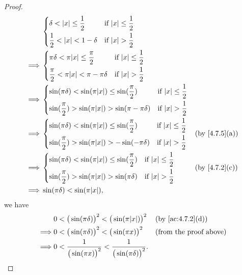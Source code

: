 \begin{proof}
\begin{align*}
             & \begin{dcases}
                 \delta < \abs{x} \leq \dfrac{1}{2}  & \text{if } \abs{x} \leq \dfrac{1}{2} \\
                 \dfrac{1}{2} < \abs{x} < 1 - \delta & \text{if } \abs{x} > \dfrac{1}{2}    \\
               \end{dcases}                               \\
    \implies & \begin{dcases}
                 \pi \delta < \pi \abs{x} \leq \dfrac{\pi}{2}    & \text{if } \abs{x} \leq \dfrac{1}{2} \\
                 \dfrac{\pi}{2} < \pi \abs{x} < \pi - \pi \delta & \text{if } \abs{x} > \dfrac{1}{2}    \\
               \end{dcases}                   \\
    \implies & \begin{dcases}
                 \sin(\pi \delta) < \sin(\pi \abs{x}) \leq \sin(\dfrac{\pi}{2})    & \text{if } \abs{x} \leq \dfrac{1}{2} \\
                 \sin(\dfrac{\pi}{2}) > \sin(\pi \abs{x}) > \sin(\pi - \pi \delta) & \text{if } \abs{x} > \dfrac{1}{2}    \\
               \end{dcases} \\
    \implies & \begin{dcases}
                 \sin(\pi \delta) < \sin(\pi \abs{x}) \leq \sin(\dfrac{\pi}{2}) & \text{if } \abs{x} \leq \dfrac{1}{2} \\
                 \sin(\dfrac{\pi}{2}) > \sin(\pi \abs{x}) > -\sin(-\pi \delta)  & \text{if } \abs{x} > \dfrac{1}{2}    \\
               \end{dcases}    &  & \text{(by \cref{4.7.5}(a))}    \\
    \implies & \begin{dcases}
                 \sin(\pi \delta) < \sin(\pi \abs{x}) \leq \sin(\dfrac{\pi}{2}) & \text{if } \abs{x} \leq \dfrac{1}{2} \\
                 \sin(\dfrac{\pi}{2}) > \sin(\pi \abs{x}) > \sin(\pi \delta)    & \text{if } \abs{x} > \dfrac{1}{2}    \\
               \end{dcases}    &  & \text{(by \cref{4.7.2}(c))}    \\
    \implies & \sin(\pi \delta) < \sin(\pi \abs{x}),
  \end{align*}
  we have
  \begin{align*}
             & 0 < \big(\sin(\pi \delta)\big)^2 < \big(\sin(\pi \abs{x})\big)^2                  &  & \text{(by \cref{ac:4.7.2}(d))} \\
    \implies & 0 < \big(\sin(\pi \delta)\big)^2 < \big(\sin(\pi x)\big)^2                        &  & \text{(from the proof above)}  \\
    \implies & 0 < \dfrac{1}{\big(\sin(\pi x)\big)^2} < \dfrac{1}{\big(\sin(\pi \delta)\big)^2}.
  \end{align*}
\end{proof}

